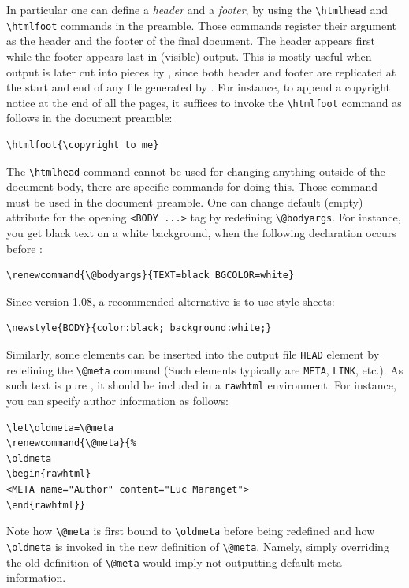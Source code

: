 In particular one can define a \emph{header} and a \emph{footer}, by using the
\verb+\htmlhead+ and \verb+\htmlfoot+ commands in the preamble.
Those commands register their argument as the header and the footer of
the final \html{} document. The header appears first while the footer
appears last in (visible) \html{} output.
This is mostly useful when \hevea{} output is later cut into pieces by
\hacha{}, since both header and footer are replicated
at the start and end of any file generated by \hacha.
For instance, to append a copyright notice at the end of all the \html{}
pages, it suffices to invoke the \verb+\htmlfoot+ command as follows
in the document preamble:
\begin{verbatim}
\htmlfoot{\copyright to me}
\end{verbatim}


\label{metadef}
The \verb+\htmlhead+ command cannot be used for changing anything outside of
the \html{} document body, there are specific commands for doing this.
Those command must be used in the document preamble.
One can
change \hevea{} default (empty) attribute for
the opening \verb+<BODY ...>+ tag by redefining
\verb+\@bodyargs+.
For instance, you get black text on a white background, when the
following declaration occurs before \verb++:
\begin{verbatim}
\renewcommand{\@bodyargs}{TEXT=black BGCOLOR=white}
\end{verbatim}
Since version 1.08, a recommended alternative is to use style sheets:
\begin{verbatim}
\newstyle{BODY}{color:black; background:white;}
\end{verbatim}


\label{exlet}Similarly, some elements can be inserted into the output file
\verb+HEAD+ element by redefining the \verb+\@meta+ command
(Such elements typically are \verb+META+, \verb+LINK+, etc.).
As such text is pure \html{}, it should be included in a
\verb+rawhtml+ environment. For instance, you can specify
author information as follows:
\begin{verbatim}
\let\oldmeta=\@meta
\renewcommand{\@meta}{%
\oldmeta
\begin{rawhtml}
<META name="Author" content="Luc Maranget">
\end{rawhtml}}
\end{verbatim}
Note how \verb+\@meta+ is first bound to
\verb+\oldmeta+ before being redefined and how \verb+\oldmeta+ is
invoked in the new definition of \verb+\@meta+.
Namely, simply overriding the old definition of \verb+\@meta+ would
imply not outputting default meta-information.

